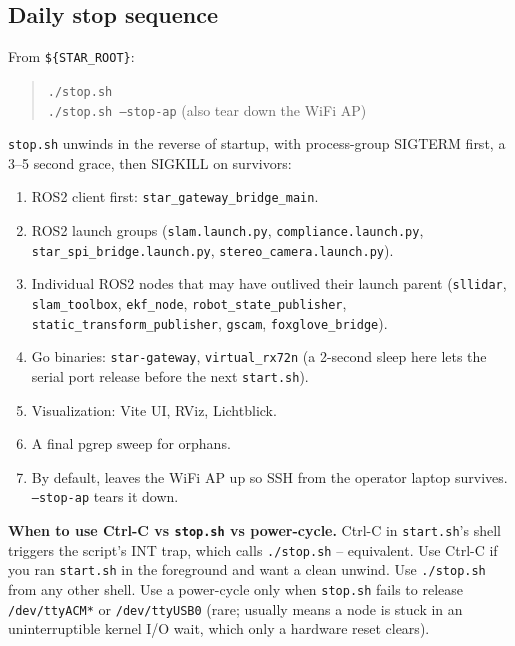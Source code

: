 \subsection{Daily stop sequence}

From \texttt{\$\{STAR\_ROOT\}}:

\begin{quote}\small
\texttt{./stop.sh}\\
\texttt{./stop.sh --stop-ap}      \quad (also tear down the WiFi AP)
\end{quote}

\texttt{stop.sh} unwinds in the reverse of startup, with
process-group SIGTERM first, a 3--5 second grace, then SIGKILL on
survivors:

\begin{enumerate}
  \item ROS2 client first: \texttt{star\_gateway\_bridge\_main}.
  \item ROS2 launch groups (\texttt{slam.launch.py},
        \texttt{compliance.launch.py},
        \texttt{star\_spi\_bridge.launch.py},
        \texttt{stereo\_camera.launch.py}).
  \item Individual ROS2 nodes that may have outlived their launch
        parent (\texttt{sllidar}, \texttt{slam\_toolbox},
        \texttt{ekf\_node}, \texttt{robot\_state\_publisher},
        \texttt{static\_transform\_publisher}, \texttt{gscam},
        \texttt{foxglove\_bridge}).
  \item Go binaries: \texttt{star-gateway}, \texttt{virtual\_rx72n}
        (a 2-second sleep here lets the serial port release before
        the next \texttt{start.sh}).
  \item Visualization: Vite UI, RViz, Lichtblick.
  \item A final pgrep sweep for orphans.
  \item By default, leaves the WiFi AP up so SSH from the operator
        laptop survives. \texttt{--stop-ap} tears it down.
\end{enumerate}

\textbf{When to use Ctrl-C vs \texttt{stop.sh} vs power-cycle.}
Ctrl-C in \texttt{start.sh}'s shell triggers the script's INT trap,
which calls \texttt{./stop.sh} -- equivalent. Use Ctrl-C if you ran
\texttt{start.sh} in the foreground and want a clean unwind. Use
\texttt{./stop.sh} from any other shell. Use a power-cycle only when
\texttt{stop.sh} fails to release \texttt{/dev/ttyACM*} or
\texttt{/dev/ttyUSB0} (rare; usually means a node is stuck in an
uninterruptible kernel I/O wait, which only a hardware reset clears).

